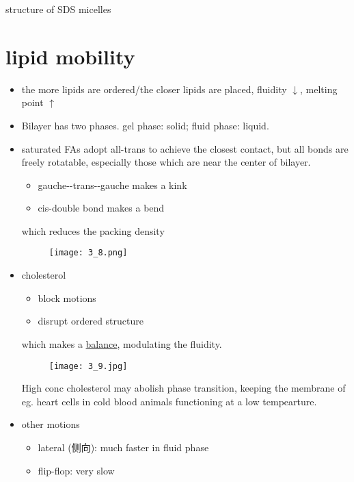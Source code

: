 structure of SDS micelles

\hypertarget{lipid-mobility}{%
	\section{lipid mobility}\label{lipid-mobility}}

\begin{itemize}
	\item
	the more lipids are ordered/the closer lipids are placed, fluidity
	\(\downarrow\), melting point \(\uparrow\)
	\item
	Bilayer has two phases. gel phase: solid; fluid phase: liquid.
	\item
	saturated FAs adopt all-trans to achieve the closest contact, but all
	bonds are freely rotatable, especially those which are near the center
	of bilayer.
	
	\begin{itemize}
		\item
		gauche-\/-trans-\/-gauche makes a kink
		\item
		cis-double bond makes a bend
	\end{itemize}
	
	which reduces the packing density
	
	\begin{figure}
		\centering
		\texttt{[image: 3\_8.png]}
		\caption{}
	\end{figure}
	\item
	cholesterol
	
	\begin{itemize}
		\item
		block motions
		\item
		disrupt ordered structure
	\end{itemize}
	
	which makes a \underline{balance}, modulating the fluidity.
	
	\begin{figure}
		\centering
		\texttt{[image: 3\_9.jpg]}
		\caption{}
	\end{figure}
	
	High conc cholesterol may abolish phase transition, keeping the
	membrane of eg. heart cells in cold blood animals functioning at a low
	tempearture.
	\item
	other motions
	
	\begin{itemize}
		\item
		lateral (侧向): much faster in fluid phase
		\item
		flip-flop: very slow
	\end{itemize}
\end{itemize}

